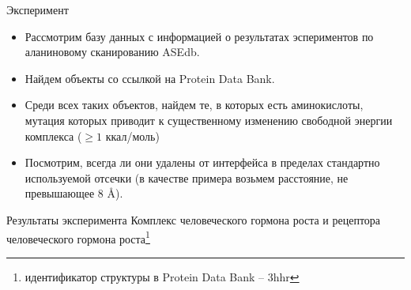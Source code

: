\documentclass[12pt, xcolor={dvipsnames}]{beamer}
\begin{document}
\begin{frame}{Эксперимент}
\begin{itemize}
\item Рассмотрим базу данных с информацией о результатах эспериментов по аланиновому сканированию ASEdb.
\item Найдем объекты со ссылкой на Protein Data Bank.
\item Среди всех таких объектов, найдем те, в которых есть аминокислоты, мутация которых приводит к существенному изменению свободной энергии комплекса ($\geq 1$ ккал/моль)
\item Посмотрим, всегда ли они удалены от интерфейса в пределах стандартно используемой отсечки (в качестве примера возьмем расстояние, не превышающее 8 \AA{}).
\end{itemize}
\end{frame}
\begin{frame}{Результаты эксперимента}
Комплекс человеческого гормона роста и рецептора человеческого гормона роста\footnote{идентификатор структуры в Protein Data Bank -- 3hhr}
\begin{center}
\end{center}
\end{frame}
\end{document}
